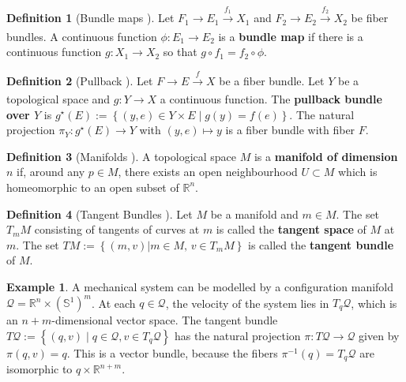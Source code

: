 \documentclass[12pt]{article}
\theoremstyle{definition}
\newtheorem{defn}{Definition}
\newtheorem{example}{Example}
\begin{document}
\begin{defn}[Bundle maps \cite{topology-fiber-bundles}]
    Let \(F_1 \rightarrow E_1 \xrightarrow[]{f_1} X_1\) and 
    \(F_2 \rightarrow E_2 \xrightarrow[]{f_2} X_2\) be fiber bundles. A
    continuous function \(\phi : E_1 \rightarrow E_2\) is a \textbf{bundle map}
    if there is a continuous function \(g : X_1 \rightarrow X_2\) so that
    \(g \circ f_1 = f_2 \circ \phi\).
\end{defn}

\begin{defn}[Pullback \cite{topology-fiber-bundles}]
    Let \(F \rightarrow E \xrightarrow[]{f} X\) be a fiber bundle. Let \(Y\) be
    a topological space and \(g : Y \rightarrow X\) a continuous function. The
    \textbf{pullback bundle over \(Y\)} is 
    \(g^\star(E) := \left\{ (y,e)\in Y \times E \mid g(y) = f(e)\right\}\). The
    natural projection \(\pi_Y : g^\star(E) \rightarrow Y\) with 
    \((y,e) \mapsto y\) is a fiber bundle with fiber \(F\).
\end{defn}

\begin{defn}[Manifolds \cite{intro-top-manifolds}]
    A topological space \(M\) is a \textbf{manifold of dimension \(n\)} if, around any
    \(p \in M\), there exists an open neighbourhood \(U \subset M\) 
    which is homeomorphic to an open subset of \(\mathbb{R}^n\).
\end{defn}

\begin{defn}[Tangent Bundles \cite{geometric-control}]
    Let \(M\) be a manifold and \(m \in M\). The set \(T_mM\) consisting of
    tangents of curves at \(m\) is called the \textbf{tangent space} of \(M\) at
    \(m\). The set \(TM := \left\{(m,v) | m \in M,\, v \in T_mM\right\}\) is
    called the \textbf{tangent bundle} of \(M\).
\end{defn}

\begin{example}\label{ex:tangent-bundle}
    A mechanical system can be modelled by a configuration manifold
    \(\mathcal{Q} = \mathbb{R}^n \times (\mathbb{S}^1)^m\). At each
    \(q \in \mathcal{Q}\), the velocity of the system lies in
    \(T_q\mathcal{Q}\), which is an \(n+m\)-dimensional vector
    space. 
    The tangent bundle
    \(T\mathcal{Q} := \left\{(q,v) \mid q \in \mathcal{Q}, v \in
    T_q\mathcal{Q}\right\}\)  has the natural
    projection \(\pi : T\mathcal{Q} \rightarrow \mathcal{Q}\) given by 
    \(\pi(q,v) = q\). This is a vector bundle, because the fibers 
    \(\pi^{-1}(q) = T_q\mathcal{Q}\) are isomorphic to 
    \({q} \times \mathbb{R}^{n+m}\).
\end{example}
\end{document}
